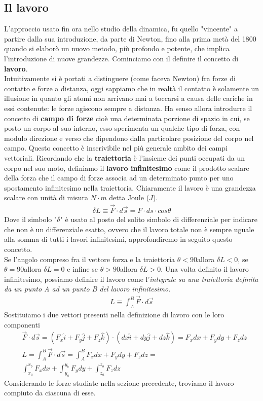 \documentclass[10pt,a4paper]{article}
\begin{document}
\subsection{Il lavoro}
L'approccio usato fin ora nello studio della dinamica, fu quello "vincente" a partire dalla sua introduzione, da parte di Newton, fino alla prima metà del 1800 quando si elaborò un nuovo metodo, più profondo e potente, che implica l'introduzione di nuove grandezze. Cominciamo con il definire il concetto di \textbf{lavoro}.\\
Intuitivamente si è portati a distinguere (come faceva Newton) fra forze di contatto e forze a distanza, oggi sappiamo che in realtà il contatto è solamente un illusione in quanto gli atomi non arrivano mai a toccarsi a causa delle cariche in essi contenute: le forze agiscono sempre a distanza. Ha senso allora introdurre il concetto di \textbf{campo di forze} cioè una determinata porzione di spazio in cui, se posto un corpo al suo interno, esso sperimenta un qualche tipo di forza, con modulo direzione e verso che dipendono dalla particolare posizione del corpo nel campo. Questo concetto è inscrivibile nel più generale ambito dei campi vettoriali. Ricordando che la \textbf{traiettoria} è l'insieme dei punti occupati da un corpo nel suo moto, definiamo il \textbf{lavoro infinitesimo} come il prodotto scalare della forza che il campo di forze associa ad un determinato punto per uno spostamento infinitesimo nella traiettoria. Chiaramente il lavoro è una grandezza scalare con unità di misura $N \cdot m$ detta Joule ($J$).
\begin{align*}
	\delta L \equiv \vec{F} \cdot d\vec{s} = F \cdot ds\cdot cos\theta
\end{align*}
Dove il simbolo "$\delta$" è usato al posto del solito simbolo di differenziale per indicare che non è un differenziale esatto, ovvero che il lavoro totale non è sempre uguale alla somma di tutti i lavori infinitesimi, approfondiremo in seguito questo concetto.\\
Se l'angolo compreso fra il vettore forza e la traiettoria $\theta < 90$\textdegree allora $\delta L < 0$, se $\theta = 90$\textdegree allora $\delta L = 0$ e infine se $\theta > 90$\textdegree allora $\delta L > 0$. Una volta definito il lavoro infinitesimo, possiamo definire il lavoro come l'\textit{integrale su una traiettoria definita da un punto A ad un punto B del lavoro infinitesimo}.
\begin{align*}
L \equiv \int_{A}^{B} \vec{F} \cdot d\vec{s}
\end{align*}
Sostituiamo i due vettori presenti nella definizione di lavoro con le loro componenti
\begin{align*}
&\vec{F} \cdot d\vec{s} = (F_x \hat{i}+F_y \hat{j}+F_z \hat{k})\cdot (dx \hat{i}+dy \hat{j}+dz \hat{k}) = F_x dx+F_y dy+F_z dz\\
&L = \int_{A}^{B} \vec{F} \cdot d\vec{s} = \int_{A}^{B} F_x dx+F_y dy+F_z dz =\\
&\int_{x_a}^{x_b} F_x dx+\int_{y_a}^{y_b} F_y dy+\int_{z_a}^{z_b} F_z dz
\end{align*}
Considerando le forze studiate nella sezione precedente, troviamo il lavoro compiuto da ciascuna di esse.
\end{document}
